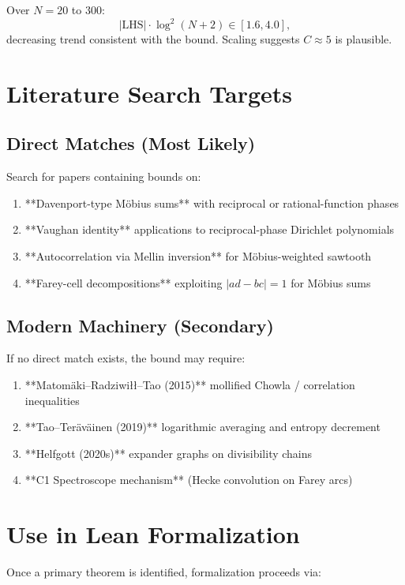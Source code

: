 \documentclass[11pt,a4paper]{article}
\begin{document}
Over $N = 20$ to $300$:
\[
\left| \text{LHS} \right| \cdot \log^2(N+2) \in [1.6, 4.0],
\]
decreasing trend consistent with the bound. Scaling suggests $C \approx 5$ is plausible.

\section{Literature Search Targets}

\subsection{Direct Matches (Most Likely)}

Search for papers containing bounds on:
\begin{enumerate}
\item **Davenport-type Möbius sums** with reciprocal or rational-function phases
\item **Vaughan identity** applications to reciprocal-phase Dirichlet polynomials
\item **Autocorrelation via Mellin inversion** for Möbius-weighted sawtooth
\item **Farey-cell decompositions** exploiting $|ad - bc| = 1$ for Möbius sums
\end{enumerate}

\subsection{Modern Machinery (Secondary)}

If no direct match exists, the bound may require:
\begin{enumerate}
\item **Matomäki–Radziwiłł–Tao (2015)** mollified Chowla / correlation inequalities
\item **Tao–Teräväinen (2019)** logarithmic averaging and entropy decrement
\item **Helfgott (2020s)** expander graphs on divisibility chains
\item **C1 Spectroscope mechanism** (Hecke convolution on Farey arcs)
\end{enumerate}

\section{Use in Lean Formalization}

Once a primary theorem is identified, formalization proceeds via:
\end{document}
